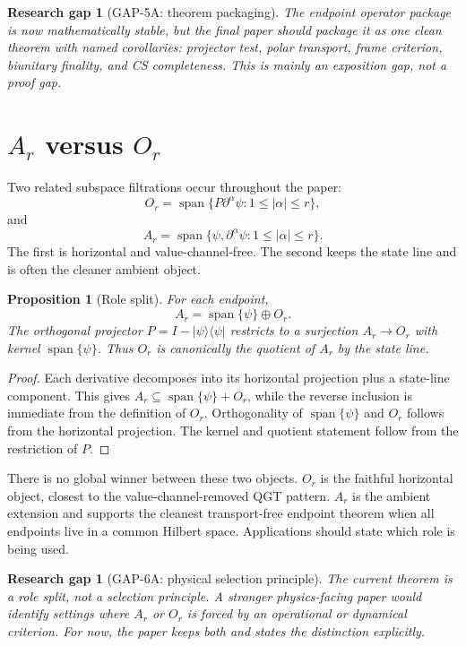 \documentclass[11pt]{amsart}
\newtheorem{proposition}[theorem]{Proposition}
\newtheorem{gap}[theorem]{Research gap}
\newcommand{\Span}{\operatorname{span}}
\newcommand{\Id}{I}
\begin{document}
\begin{gap}[GAP-5A: theorem packaging]
The endpoint operator package is now mathematically stable, but the final paper
should package it as one clean theorem with named corollaries: projector test,
polar transport, frame criterion, biunitary finality, and CS completeness. This
is mainly an exposition gap, not a proof gap.
\end{gap}

\section{\texorpdfstring{\(A_r\) versus \(O_r\)}{A r versus O r}}

Two related subspace filtrations occur throughout the paper:
\[
        O_r=\Span\{P\partial^\alpha\psi:1\le|\alpha|\le r\},
\]
and
\[
        A_r=\Span\{\psi,\partial^\alpha\psi:1\le|\alpha|\le r\}.
\]
The first is horizontal and value-channel-free. The second keeps the state line
and is often the cleaner ambient object.

\begin{proposition}[Role split]
For each endpoint,
\[
        A_r=\Span\{\psi\}\oplus O_r.
\]
The orthogonal projector \(P=\Id-|\psi\rangle\langle\psi|\) restricts to a
surjection \(A_r\to O_r\) with kernel \(\Span\{\psi\}\). Thus \(O_r\) is
canonically the quotient of \(A_r\) by the state line.
\end{proposition}

\begin{proof}
Each derivative decomposes into its horizontal projection plus a state-line
component. This gives \(A_r\subseteq \Span\{\psi\}+O_r\), while the reverse
inclusion is immediate from the definition of \(O_r\). Orthogonality of
\(\Span\{\psi\}\) and \(O_r\) follows from the horizontal projection. The
kernel and quotient statement follow from the restriction of \(P\).
\end{proof}

There is no global winner between these two objects. \(O_r\) is the faithful
horizontal object, closest to the value-channel-removed QGT pattern. \(A_r\) is
the ambient extension and supports the cleanest transport-free endpoint theorem
when all endpoints live in a common Hilbert space. Applications should state
which role is being used.

\begin{gap}[GAP-6A: physical selection principle]
The current theorem is a role split, not a selection principle. A stronger
physics-facing paper would identify settings where \(A_r\) or \(O_r\) is forced
by an operational or dynamical criterion. For now, the paper keeps both and
states the distinction explicitly.
\end{gap}
\end{document}
